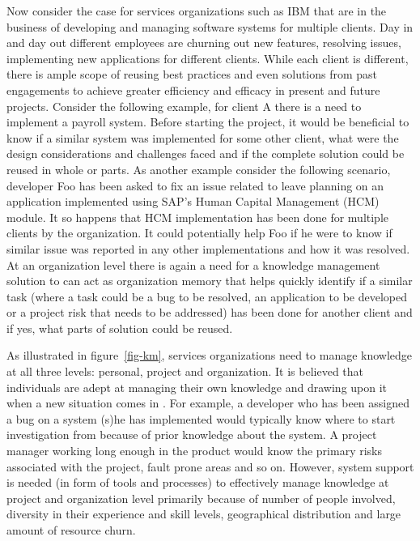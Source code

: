 Now consider the case for services organizations such as IBM that are in the business of developing and managing software systems for multiple clients. Day in and day out different employees are churning out new features, resolving issues, implementing new applications for different clients. While each client is different, there is ample scope of reusing best practices and even solutions from past engagements to achieve greater efficiency and efficacy in present and future projects. Consider the following example, for client A there is a need to implement a payroll system. Before starting the project, it would be beneficial to know if a similar system was implemented for some other client, what were the design considerations and challenges faced and if the complete solution could be reused in whole or parts. As another example consider the following scenario, developer Foo has been asked to fix an issue related to leave planning on an application implemented using SAP's Human Capital Management (HCM) module. It so happens that HCM implementation has been done for multiple clients by the organization. It could potentially help Foo if he were to know if similar issue was reported in any other implementations and how it was resolved. At an organization level there is again a need for a knowledge management solution to can act as organization memory \cite{Stein:1995} that helps quickly identify if a similar task (where a task could be a bug to be resolved, an application to be developed or a project risk that needs to be addressed) has been done for another client and if yes, what parts of solution could be reused.

As illustrated in figure~\ref{fig-km}, services organizations need to manage knowledge at all three levels: personal, project and organization. It is believed that individuals are adept at managing their own knowledge and drawing upon it when a new situation comes in \cite{Bruce:2005}. For example, a developer who has been assigned a bug on a system (s)he has implemented would typically know where to start investigation from because of prior knowledge about the system. A project manager working long enough in the product would know the primary risks associated with the project, fault prone areas and so on. However, system support is needed (in form of tools and processes) to effectively manage knowledge at project and organization level primarily because of number of people involved, diversity in their experience and skill levels, geographical distribution and large amount of resource churn.  

